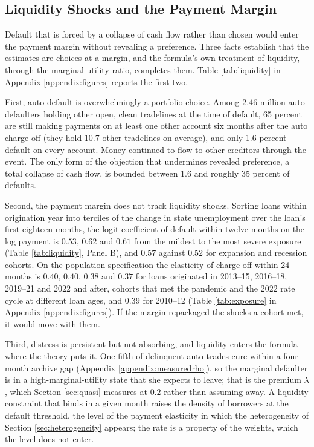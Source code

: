 \subsection{Liquidity Shocks and the Payment Margin}\label{sec:liquidity}

Default that is forced by a collapse of cash flow rather than chosen would enter the payment margin without revealing a preference. Three facts establish that the estimates are choices at a margin, and the formula's own treatment of liquidity, through the marginal-utility ratio, completes them. Table \ref{tab:liquidity} in Appendix \ref{appendix:figures} reports the first two.

First, auto default is overwhelmingly a portfolio choice. Among 2.46 million auto defaulters holding other open, clean tradelines at the time of default, 65 percent are still making payments on at least one other account six months after the auto charge-off (they hold 10.7 other tradelines on average), and only 1.6 percent default on every account. Money continued to flow to other creditors through the event. The only form of the objection that undermines revealed preference, a total collapse of cash flow, is bounded between 1.6 and roughly 35 percent of defaults.

Second, the payment margin does not track liquidity shocks. Sorting loans within origination year into terciles of the change in state unemployment over the loan's first eighteen months, the logit coefficient of default within twelve months on the log payment is $0.53$, $0.62$ and $0.61$ from the mildest to the most severe exposure (Table \ref{tab:liquidity}, Panel B), and $0.57$ against $0.52$ for expansion and recession cohorts. On the population specification the elasticity of charge-off within 24 months is $0.40$, $0.40$, $0.38$ and $0.37$ for loans originated in 2013--15, 2016--18, 2019--21 and 2022 and after, cohorts that met the pandemic and the 2022 rate cycle at different loan ages, and $0.39$ for 2010--12 (Table \ref{tab:exposure} in Appendix \ref{appendix:figures}). If the margin repackaged the shocks a cohort met, it would move with them.

Third, distress is persistent but not absorbing, and liquidity enters the formula where the theory puts it. One fifth of delinquent auto trades cure within a four-month archive gap (Appendix \ref{appendix:measuredrho}), so the marginal defaulter is in a high-marginal-utility state that she expects to leave; that is the premium $\lambda$, which Section \ref{sec:quasi} measures at $0.2$ rather than assuming away. A liquidity constraint that binds in a given month raises the density of borrowers at the default threshold, the level of the payment elasticity in which the heterogeneity of Section \ref{sec:heterogeneity} appears; the rate is a property of the weights, which the level does not enter.
